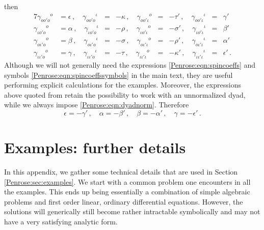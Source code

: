 then
\begin{alignat}{7}
\gamma_{oo' o}{}^{o} &= \epsilon \, , \quad \gamma_{oo' o}{}^{\iota} &=& -\kappa \, , \quad \gamma_{oo' \iota}{}^{o} &=& -\tau' \, , \quad \gamma_{oo' \iota}{}^{\iota} &=& \gamma' \nonumber \\
\gamma_{\iota o' o}{}^{o} &= \alpha \, , \quad \gamma_{\iota o' o}{}^{\iota} &=& -\rho \, , \quad \gamma_{\iota o' \iota}{}^{o} &=& -\sigma' \, , \quad \gamma_{\iota o' \iota}{}^{\iota} &=& \beta'  \nonumber  \\
\gamma_{o\iota' o}{}^{o} &= \beta \, , \quad \gamma_{o\iota' o}{}^{\iota} &=& -\sigma \, , \quad \gamma_{o\iota' \iota}{}^{o} &=& -\rho' \, , \quad \gamma_{o\iota' \iota}{}^{\iota} &=& \alpha'  \nonumber  \\
\gamma_{\iota \iota' o}{}^{o} &= \gamma \, , \quad \gamma_{\iota \iota' o}{}^{\iota} &=& -\tau \, , \quad \gamma_{\iota \iota' \iota}{}^{o} &=& -\kappa' \, , \quad \gamma_{\iota \iota' \iota}{}^{\iota} &=& \epsilon'  \, .  \label{Penrose:eqn:spincoeffs}
\end{alignat}
Although we will not generally need the expressions \eqref{Penrose:eqn:spincoeffs} and symbols \eqref{Penrose:eqn:spincoeffssymbols} in the main text, they are useful performing explicit calculations for the examples. Moreover, the expressions above quoted from \cite{Penrose:1985bww,Penrose:1986ca} retain the possibility to work with an unnormalized dyad, while we always impose \eqref{Penrose:eqn:dyadnorm}. Therefore
\begin{equation}
\epsilon = - \gamma' \, , \quad \alpha = -\beta' \, , \quad \beta = - \alpha' \, , \quad \gamma = - \epsilon' \, .
\end{equation}

\chapter{Examples: further details}\label{Penrose:app:examples}

In this appendix, we gather some technical details that are used in Section \ref{Penrose:sec:examples}. We start with a common problem one encounters in all the examples. This ends up being essentially a combination of simple algebraic problems and first order linear, ordinary differential equations. However, the solutions will generically still become rather intractable symbolically and may not have a very satisfying analytic form.

